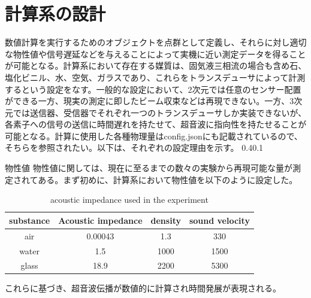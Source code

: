 \documentclass[uplatex]{suribt}
\makeatletter
\renewcommand{\subsection}{%
    \@startsection{subsection}{1}{\z@}%
    {0.4\Cvs}{0.1\Cvs}%
    {\normalfont\normalsize\headfont\raggedright}}
\makeatother
\begin{document}
\section{計算系の設計}
数値計算を実行するためのオブジェクトを点群として定義し、それらに対し適切な物性値や信号遅延などを与えることによって実機に近い測定データを得ることが可能となる。計算系において存在する媒質は、固気液三相流の場合も含め石、塩化ビニル、水、空気、ガラスであり、これらをトランスデューサによって計測するという設定をなす。一般的な設定において、2次元では任意のセンサー配置ができる一方、現実の測定に即したビーム収束などは再現できない。一方、3次元では送信器、受信器でそれぞれ一つのトランスデューサしか実装できないが、各素子への信号の送信に時間遅れを持たせて、超音波に指向性を持たせることが可能となる。計算に使用した各種物理量はconfig.jsonにも記載されているので、そちらを参照されたい。以下は、それぞれの設定理由を示す。
\subsection{物性値}
物性値に関しては、現在に至るまでの数々の実験から再現可能な量が測定されてある。まず初めに、計算系において物性値を以下のように設定した。
\begin{table}[]
    \centering
    \begin{tabular}{c|c|c|c}
    \hline
         substance & Acoustic impedance & density & sound velocity \\
         \hline
         air&  0.00043 & 1.3 & 330\\
         water& 1.5 & 1000 & 1500\\
         glass & 18.9 & 2200 & 5300\\
         \hline
    \end{tabular}
    \caption{acoustic impedance used in the experiment}
    \label{tab:acoustic impedance}
\end{table}
これらに基づき、超音波伝播が数値的に計算され時間発展が表現される。
\end{document}
